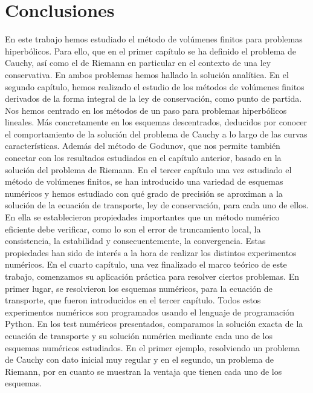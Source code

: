 \chapter{Conclusiones}\label{ch:conclusions}

En este trabajo hemos estudiado el método de volúmenes finitos para
problemas hiperbólicos.
Para ello, que en el primer capítulo se ha definido el problema de
Cauchy, así como el de Riemann en particular en el contexto de una
ley conservativa.
En ambos problemas hemos hallado la solución analítica.
En el segundo capítulo, hemos realizado el estudio de los métodos de
volúmenes finitos derivados de la forma integral de la ley de
conservación, como punto de partida.
Nos hemos centrado en los métodos de un paso para problemas
hiperbólicos lineales.
Más concretamente en los esquemas descentrados, deducidos por conocer
el comportamiento de la solución del problema de Cauchy a lo largo de
las curvas características.
Además del método de Godunov, que nos permite también conectar con
los resultados estudiados en el capítulo anterior, basado en la
solución del problema de Riemann.
En el tercer capítulo una vez estudiado el método de volúmenes
finitos, se han introducido una variedad de esquemas numéricos y
hemos estudiado con qué grado de precisión se aproximan a la solución
de la ecuación de transporte, ley de conservación, para cada uno de
ellos.
En ella se establecieron propiedades importantes que un método
numérico eficiente debe verificar, como lo son el error de
truncamiento local, la consistencia, la estabilidad y
consecuentemente, la convergencia.
Estas propiedades han sido de interés a la hora de realizar los
distintos experimentos numéricos.
En el cuarto capítulo, una vez finalizado el marco teórico de este
trabajo, comenzamos su aplicación práctica para resolver ciertos
problemas.
En primer lugar, se resolvieron los esquemas numéricos, para la
ecuación de transporte, que fueron introducidos en el tercer
capítulo.
Todos estos experimentos numéricos son programados usando el lenguaje
de programación Python.
En los test numéricos presentados, comparamos la solución exacta de
la ecuación de transporte y su solución numérica mediante cada uno de
los esquemas numéricos estudiados.
En el primer ejemplo, resolviendo un problema de Cauchy con dato
inicial muy regular y en el segundo, un problema de Riemann, por en
cuanto se muestran la ventaja que tienen cada uno de los esquemas.